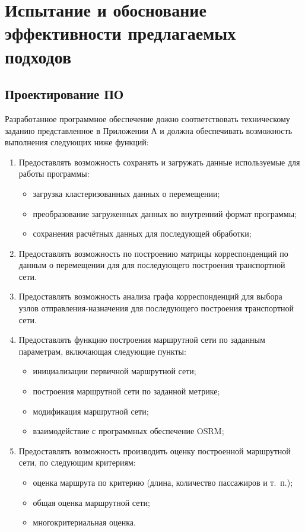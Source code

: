 \chapter{Испытание и обоснование эффективности предлагаемых подходов}
\section{Проектирование ПО}
Разработанное программное обеспечение дожно соответствовать техническому заданию представленное в Приложении А и 
должна обеспечивать возможность выполнения следующих ниже функций:
\begin{enumerate}
    \item Предоставлять возможность сохранять и загружать данные используемые для работы программы:
    \begin{itemize}
        \item загрузка кластеризованных данных о перемещении;
        \item преобразование загруженных данных во внутренний формат программы;
        \item сохранения расчётных данных для последующей обработки;
    \end{itemize}
    \item Предоставлять возможность по построению матрицы корреспонденций по данным о перемещении для 
        для последующего построения транспортной сети.
    \item Предоставлять возможность анализа графа корреспонденций для выбора узлов отправления-назначения для 
        последующего построения транспортной сети.
    \item Предоставлять функцию построения маршрутной сети по заданным параметрам, включающая следующие пункты:
    \begin{itemize}
        \item инициализации первичной маршрутной сети;
        \item построения маршрутной сети по заданной метрике;
        \item модификация маршрутной сети;
        \item взаимодействие с программных обеспечение OSRM;
    \end{itemize}
    \item Предоставлять возможность производить оценку построенной маршрутной сети, по следующим критериям:
    \begin{itemize}
        \item оценка маршрута по критерию (длина, количество пассажиров и т.~п.);
        \item общая оценка маршрутной сети;
        \item многокритериальная оценка.
    \end{itemize}
\end{enumerate}

